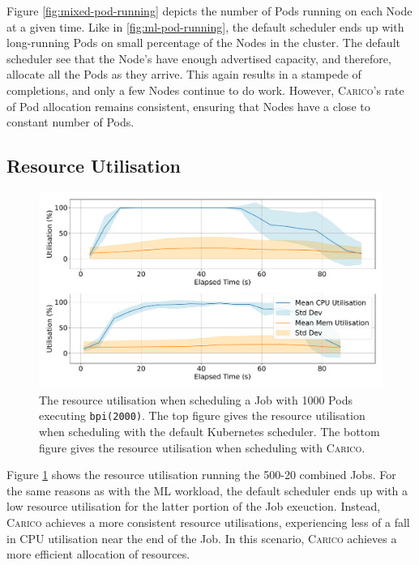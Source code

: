 Figure \ref{fig:mixed-pod-running} depicts the number of Pods running on each Node
at a given time. Like in \ref{fig:ml-pod-running}, the default scheduler ends up
with long-running Pods on small percentage of the Nodes in the cluster. The
default scheduler see that the Node's have enough advertised capacity, and
therefore, allocate all the Pods as they arrive. This again results in a
stampede of completions, and only a few Nodes continue to do work. However,
\textsc{Carico}'s rate of Pod allocation remains consistent, ensuring that Nodes have a
close to constant number of Pods.

\subsection{Resource Utilisation}

\begin{figure}[ht!]
    \centering
    \includegraphics[width=\textwidth]{images/mixed-util.pdf}
    \caption{The resource utilisation when scheduling a Job with 1000 Pods
    executing \texttt{bpi(2000)}. The top figure gives the resource utilisation
    when scheduling with the default Kubernetes scheduler. The bottom figure
    gives the resource utilisation when scheduling with \textsc{Carico}.}
    \label{fig:mixed-util}
\end{figure}

Figure \ref{fig:mixed-util} shows the resource utilisation running the 500-20
combined Jobs. For the same reasons as with the  ML workload, the default
scheduler ends up with a low resource utilisation for the
latter portion of the Job exeuction. Instead, \textsc{Carico} achieves a more consistent
resource utilisations, experiencing less of a fall in CPU utilisation near the
end of the Job. In this scenario, \textsc{Carico} achieves a more efficient allocation of
resources.

